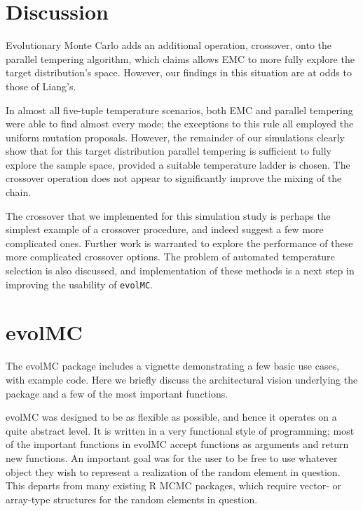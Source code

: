 \documentclass[12pt]{article}\usepackage[]{graphicx}\usepackage[]{color}
\begin{document}
\section{Discussion}
\label{sec:discussion}

Evolutionary Monte Carlo adds an additional operation, crossover, onto
the parallel tempering algorithm, which \cite{Liang:2011} claims
allows EMC to more fully explore the target distribution's space.
However, our findings in this situation are at odds to those of Liang's.

In almost all five-tuple temperature scenarios, both EMC and parallel
tempering were able to find almost every mode; the exceptions to this
rule all employed the uniform mutation proposals.  However, the
remainder of our simulations clearly show that for this target
distribution parallel tempering is sufficient to fully explore the
sample space, provided a suitable temperature ladder is chosen. The
crossover operation does not appear to significantly improve the
mixing of the chain.

The crossover that we implemented for this simulation study is perhaps
the simplest example of a crossover procedure, and indeed
\cite{Liang:2011} suggest a few more complicated ones. Further work
is warranted to explore the performance of these more complicated
crossover options. The problem of automated temperature selection is
also discussed, and implementation of these methods is a next step in
improving the usability of {\tt evolMC}.


 

\appendix

\section{evolMC}
\label{sec:evolmc}
The evolMC package includes a vignette demonstrating a few basic use cases, with example code. Here we briefly discuss the architectural vision underlying the package and a few of the most important functions.

evolMC was designed to be as flexible as possible, and hence it operates on a quite abstract level. It is written in a very functional style of programming; most of the important functions in evolMC accept functions as arguments and return new functions. An important goal was for the user to be free to use whatever object they wish to represent a realization of the random element in question. This departs from many existing R MCMC packages, which require vector- or array-type structures for the random elements in question.
\end{document}
